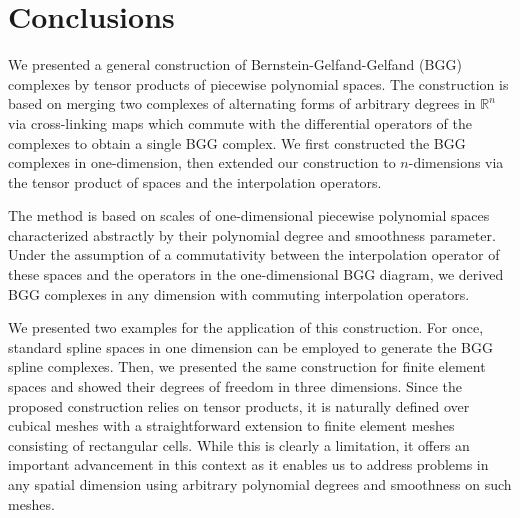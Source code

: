 \documentclass[final]{amsart}%
\newcommand{\0}{\mathaccent23}
\begin{document}
\section{Conclusions}\label{sec:conclusion}

We presented a general construction of Bernstein-Gelfand-Gelfand (BGG) complexes by tensor products of piecewise polynomial spaces. 
The construction is based on merging two complexes of alternating forms of arbitrary degrees in $\mathbb{R}^n$ via cross-linking maps which commute with the differential operators of the complexes to obtain a single BGG complex. We first constructed the BGG complexes in one-dimension, then extended our construction to $n$-dimensions via the tensor product of spaces and the interpolation operators.

The method is based on scales of one-dimensional piecewise polynomial spaces characterized abstractly by their polynomial degree and smoothness parameter. Under the assumption of a commutativity between the interpolation operator of these spaces and the operators in the one-dimensional BGG diagram, we derived BGG complexes in any dimension with commuting interpolation operators.

We presented two examples for the application of this construction. For once, standard spline spaces in one dimension can be employed to generate the BGG spline complexes. Then, we presented the same construction for finite element spaces and showed their degrees of freedom in three dimensions.
Since the proposed construction relies on tensor products, it is naturally defined over cubical meshes with a straightforward extension to finite element meshes consisting of rectangular cells.
While this is clearly a limitation, it offers an important advancement in this context as it enables us to address problems in any spatial dimension using arbitrary polynomial degrees and smoothness on such meshes.
\end{document}
